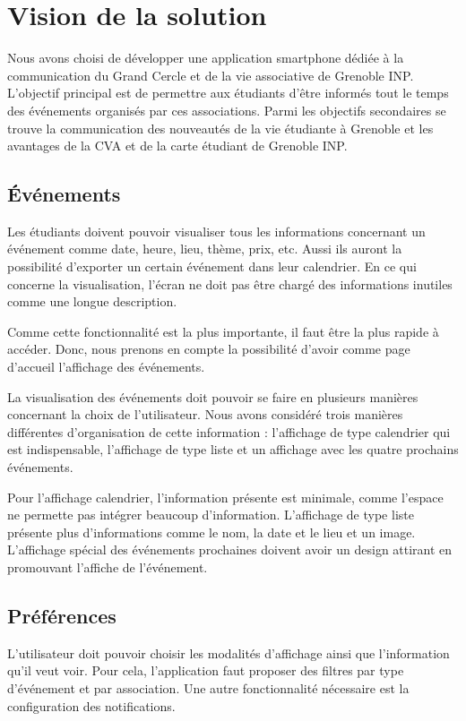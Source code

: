 \documentclass[a4paper, 11px]{article}
\begin{document}
\newpage


\section{Vision de la solution}
Nous avons choisi de développer une application smartphone dédiée à la communication du Grand Cercle et de la vie associative de Grenoble INP. L'objectif principal est de permettre aux étudiants d'être informés tout le temps des événements organisés par ces associations. Parmi les objectifs secondaires se trouve la communication des nouveautés de la vie étudiante à Grenoble et les avantages de la CVA et de la carte étudiant de Grenoble INP.

\subsection{Événements}
Les étudiants doivent pouvoir visualiser tous les informations concernant un événement comme date, heure, lieu, thème, prix, etc. Aussi ils auront la possibilité d'exporter un certain événement dans leur calendrier. En ce qui concerne la visualisation, l'écran ne doit pas être chargé des informations inutiles comme une longue description.

Comme cette fonctionnalité est la plus importante, il faut être la plus rapide à accéder. Donc, nous prenons en compte la possibilité d'avoir comme page d'accueil l'affichage des événements.

La visualisation des événements doit pouvoir se faire en plusieurs manières concernant la choix de l'utilisateur. Nous avons considéré trois manières différentes d'organisation de cette information : l'affichage de type calendrier qui est indispensable, l'affichage de type liste et un affichage avec les quatre prochains événements.

Pour l'affichage calendrier, l'information présente est minimale, comme l'espace ne permette pas intégrer beaucoup d'information. L'affichage de type liste présente plus d'informations comme le nom, la date et le lieu et un image. L'affichage spécial des événements prochaines doivent avoir un design attirant en promouvant l'affiche de l'événement.

\subsection{Préférences}

L'utilisateur doit pouvoir choisir les modalités d'affichage ainsi que l'information qu'il veut voir. Pour cela, l'application faut proposer des filtres par type d'événement et par association. Une autre fonctionnalité nécessaire est la configuration des notifications.
\end{document}
